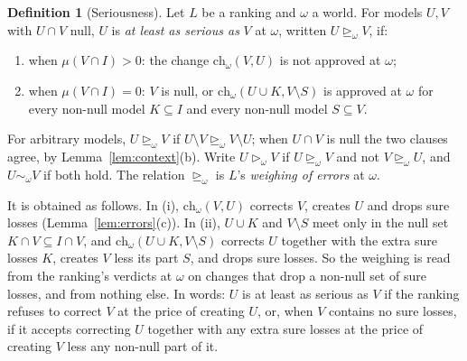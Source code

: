 \documentclass[11pt]{article}
\theoremstyle{definition}
\newtheorem{definition}[theorem]{Definition}
\newcommand{\ch}{\mathrm{ch}}
\newcommand{\sge}{\trianglerighteq}
\newcommand{\sgt}{\triangleright}
\begin{document}
\begin{definition}[Seriousness]\label{def:serious}
Let $L$ be a ranking and $\omega$ a world. For models $U,V$ with $U\cap V$ null, $U$ is \emph{at least as serious as} $V$ at $\omega$, written $U\sge_\omega V$, if:
\begin{enumerate}[label=(\roman*)]
\item when $\mu(V\cap I)>0$: the change $\ch_\omega(V,U)$ is not approved at $\omega$;
\item when $\mu(V\cap I)=0$: $V$ is null, or $\ch_\omega(U\cup K,V\setminus S)$ is approved at $\omega$ for every non-null model $K\subseteq I$ and every non-null model $S\subseteq V$.
\end{enumerate}
For arbitrary models, $U\sge_\omega V$ if $U\setminus V\sge_\omega V\setminus U$; when $U\cap V$ is null the two clauses agree, by Lemma~\ref{lem:context}(b). Write $U\sgt_\omega V$ if $U\sge_\omega V$ and not $V\sge_\omega U$, and $U\sim_\omega V$ if both hold. The relation $\sge_\omega$ is $L$'s \emph{weighing of errors} at $\omega$.

It is obtained as follows. In (i), $\ch_\omega(V,U)$ corrects $V$, creates $U$ and drops sure losses (Lemma~\ref{lem:errors}(c)). In (ii), $U\cup K$ and $V\setminus S$ meet only in the null set $K\cap V\subseteq I\cap V$, and $\ch_\omega(U\cup K,V\setminus S)$ corrects $U$ together with the extra sure losses $K$, creates $V$ less its part $S$, and drops sure losses. So the weighing is read from the ranking's verdicts at $\omega$ on changes that drop a non-null set of sure losses, and from nothing else. In words: $U$ is at least as serious as $V$ if the ranking refuses to correct $V$ at the price of creating $U$, or, when $V$ contains no sure losses, if it accepts correcting $U$ together with any extra sure losses at the price of creating $V$ less any non-null part of it.
\end{definition}
\end{document}
